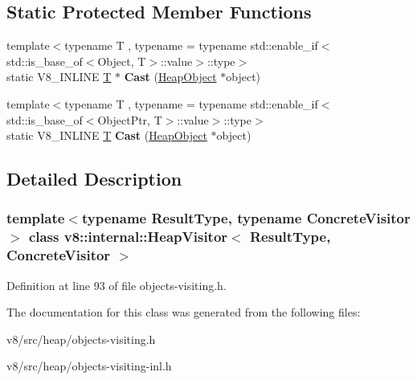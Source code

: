 \subsection*{Static Protected Member Functions}
\begin{DoxyCompactItemize}
\item 
\mbox{\label{classv8_1_1internal_1_1HeapVisitor_a0a3645f75a70cf2e442ab4fd3cbceae9}} 
{\footnotesize template$<$typename T , typename  = typename std\+::enable\+\_\+if$<$                            std\+::is\+\_\+base\+\_\+of$<$\+Object, T$>$\+::value$>$\+::type$>$ }\\static V8\+\_\+\+I\+N\+L\+I\+NE \mbox{\hyperlink{classv8_1_1internal_1_1torque_1_1T}{T}} $\ast$ {\bfseries Cast} (\mbox{\hyperlink{classv8_1_1internal_1_1HeapObject}{Heap\+Object}} $\ast$object)
\item 
\mbox{\label{classv8_1_1internal_1_1HeapVisitor_a70ca0fd1cc5e4622712420bb0b3929ff}} 
{\footnotesize template$<$typename T , typename  = typename std\+::enable\+\_\+if$<$                            std\+::is\+\_\+base\+\_\+of$<$\+Object\+Ptr, T$>$\+::value$>$\+::type$>$ }\\static V8\+\_\+\+I\+N\+L\+I\+NE \mbox{\hyperlink{classv8_1_1internal_1_1torque_1_1T}{T}} {\bfseries Cast} (\mbox{\hyperlink{classv8_1_1internal_1_1HeapObject}{Heap\+Object}} $\ast$object)
\end{DoxyCompactItemize}


\subsection{Detailed Description}
\subsubsection*{template$<$typename Result\+Type, typename Concrete\+Visitor$>$\newline
class v8\+::internal\+::\+Heap\+Visitor$<$ Result\+Type, Concrete\+Visitor $>$}



Definition at line 93 of file objects-\/visiting.\+h.



The documentation for this class was generated from the following files\+:\begin{DoxyCompactItemize}
\item 
v8/src/heap/objects-\/visiting.\+h\item 
v8/src/heap/objects-\/visiting-\/inl.\+h\end{DoxyCompactItemize}
